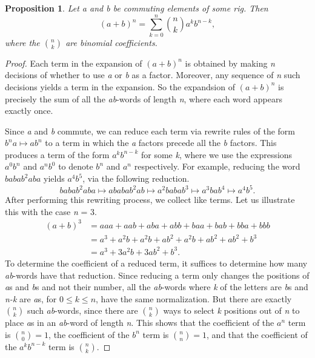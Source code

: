\documentclass[12pt]{article}
\newtheorem*{proposition*}{Proposition}
\newcommand{\fm}[1]{{\it #1}}
\begin{document}
\begin{proposition*}
Let \fm{a} and \fm{b} be commuting elements of some rig.  Then
\[
(a+b)^n = \sum_{k=0}^n \binom{n}{k} a^k b^{n-k},
\]
where the $\binom{n}{k}$ are binomial coefficients.
\end{proposition*}

\begin{proof}
Each term in the expansion of $(a+b)^n$ is obtained by making \fm{n}
decisions of whether to use \fm{a} or \fm{b} as a factor.  Moreover,
any sequence of \fm{n} such decisions yields a term in the expansion.
So the expandsion of $(a+b)^n$ is precisely the sum of all the
\fm{ab}-words of length \fm{n}, where each word appears exactly once.

Since \fm{a} and \fm{b} commute, we can reduce each term via rewrite
rules of the form $b^na\mapsto ab^n$ to a term in which the \fm{a}
factors precede all the \fm{b} factors.  This produces a term of the
form $a^k b^{n-k}$ for some \fm{k}, where we use the expressions $a^0
b^n$ and $a^n b^0$ to denote $b^n$ and $a^n$ respectively.  For
example, reducing the word $babab^2aba$ yields $a^4 b^5$, via the
following reduction.
\[
babab^2aba \mapsto
a ba ba b^2a b \mapsto
a^2babab^3 \mapsto
a^3bab^4 \mapsto
a^4b^5.
\]
After performing this rewriting process, we collect like terms.  Let
us illustrate this with the case \fm{n} = 3.
\begin{align*}
(a+b)^3
&= aaa + aab + aba + abb + baa + bab + bba + bbb \\
&= a^3 + a^2b + a^2 b + ab^2 +a^2 b + ab^2 + ab^2 + b^3 \\
&= a^3 + 3a^2b + 3ab^2 + b^3.
\end{align*}
To determine the coefficient of a reduced term, it suffices to
determine how many \fm{ab}-words have that reduction.  Since reducing
a term only changes the positions of \fm{a}s and \fm{b}s and not their
number, all the \fm{ab}-words where \fm{k} of the letters are \fm{b}s
and \fm{n-k} are \fm{a}s, for $0\le k\le n$, have the same
normalization.  But there are exactly $\binom{n}{k}$ such
\fm{ab}-words, since there are $\binom{n}{k}$ ways to select \fm{k}
positions out of \fm{n} to place \fm{a}s in an \fm{ab}-word of length
\fm{n}.  This shows that the coefficient of the $a^n$ term is
$\binom{n}{0}=1$, the coefficient of the $b^n$ term is
$\binom{n}{n}=1$, and that the coefficient of the $a^k b^{n-k}$ term
is $\binom{n}{k}$.
\end{proof}


\end{document}
